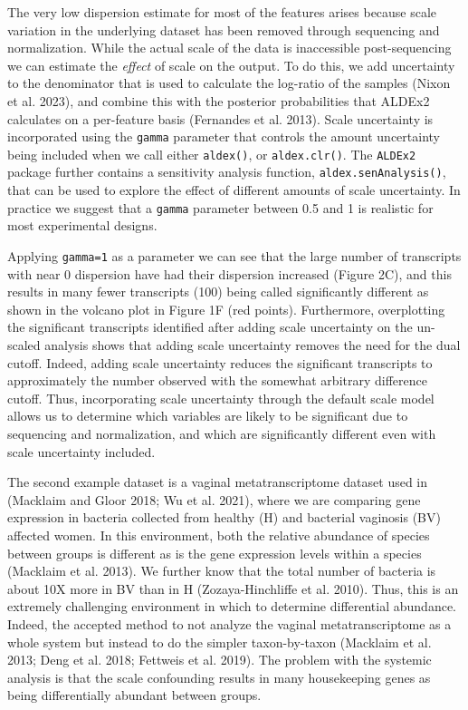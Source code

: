 \documentclass[
]{article}
\begin{document}
The very low dispersion estimate for most of the features arises because
scale variation in the underlying dataset has been removed through
sequencing and normalization. While the actual scale of the data is
inaccessible post-sequencing we can estimate the \emph{effect} of scale
on the output. To do this, we add uncertainty to the denominator that is
used to calculate the log-ratio of the samples (Nixon et al. 2023), and
combine this with the posterior probabilities that ALDEx2 calculates on
a per-feature basis (Fernandes et al. 2013). Scale uncertainty is
incorporated using the \texttt{gamma} parameter that controls the amount
uncertainty being included when we call either \texttt{aldex()}, or
\texttt{aldex.clr()}. The \texttt{ALDEx2} package further contains a
sensitivity analysis function, \texttt{aldex.senAnalysis()}, that can be
used to explore the effect of different amounts of scale uncertainty. In
practice we suggest that a \texttt{gamma} parameter between 0.5 and 1 is
realistic for most experimental designs.

Applying \texttt{gamma=1} as a parameter we can see that the large
number of transcripts with near 0 dispersion have had their dispersion
increased (Figure 2C), and this results in many fewer transcripts (100)
being called significantly different as shown in the volcano plot in
Figure 1F (red points). Furthermore, overplotting the significant
transcripts identified after adding scale uncertainty on the un-scaled
analysis shows that adding scale uncertainty removes the need for the
dual cutoff. Indeed, adding scale uncertainty reduces the significant
transcripts to approximately the number observed with the somewhat
arbitrary difference cutoff. Thus, incorporating scale uncertainty
through the default scale model allows us to determine which variables
are likely to be significant due to sequencing and normalization, and
which are significantly different even with scale uncertainty included.

The second example dataset is a vaginal metatranscriptome dataset used
in (Macklaim and Gloor 2018; Wu et al. 2021), where we are comparing
gene expression in bacteria collected from healthy (H) and bacterial
vaginosis (BV) affected women. In this environment, both the relative
abundance of species between groups is different as is the gene
expression levels within a species (Macklaim et al. 2013). We further
know that the total number of bacteria is about 10X more in BV than in H
(Zozaya-Hinchliffe et al. 2010). Thus, this is an extremely challenging
environment in which to determine differential abundance. Indeed, the
accepted method to not analyze the vaginal metatranscriptome as a whole
system but instead to do the simpler taxon-by-taxon (Macklaim et al.
2013; Deng et al. 2018; Fettweis et al. 2019). The problem with the
systemic analysis is that the scale confounding results in many
housekeeping genes as being differentially abundant between groups.
\end{document}
